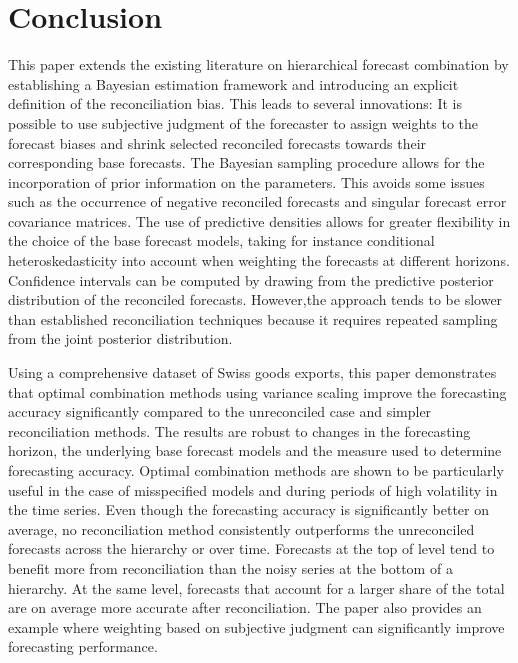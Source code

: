 \documentclass[a4paper,fleqn,11pt]{article}
\begin{document}
\section{Conclusion}\label{sec:conc}

This paper extends the existing literature on hierarchical forecast combination by establishing a Bayesian estimation framework and introducing an explicit definition of the reconciliation bias. This leads to several innovations: It is possible to use subjective judgment of the forecaster to assign weights to the forecast biases and shrink selected reconciled forecasts towards their corresponding base forecasts. The Bayesian sampling procedure allows for the incorporation of prior information on the parameters. This avoids some issues such as the occurrence of negative reconciled forecasts and singular forecast error covariance matrices. The use of predictive densities allows for greater flexibility in the choice of the base forecast models, taking for instance conditional heteroskedasticity into account when weighting the forecasts at different horizons. Confidence intervals can be computed by drawing from the predictive posterior distribution of the reconciled forecasts. However,the approach tends to be slower than established reconciliation techniques because it requires repeated sampling from the joint posterior distribution.

Using a comprehensive dataset of Swiss goods exports, this paper demonstrates that optimal combination methods using variance scaling improve the forecasting accuracy significantly compared to the unreconciled case and simpler reconciliation methods. The results are robust to changes in the forecasting horizon, the underlying base forecast models and the measure used to determine forecasting accuracy. Optimal combination methods are shown to be particularly useful in the case of misspecified models and during periods of high volatility in the time series. Even though the forecasting accuracy is significantly better on average, no reconciliation method consistently outperforms the unreconciled forecasts across the hierarchy or over time. Forecasts at the top of level tend to benefit more from reconciliation than the noisy series at the bottom of a hierarchy. At the same level, forecasts that account for a larger share of the total are on average more accurate after reconciliation. The paper also provides an example where weighting based on subjective judgment can significantly improve forecasting performance.

\clearpage

\setcounter{page}{2}



\clearpage


\end{document}
